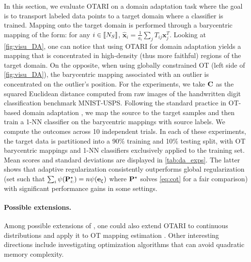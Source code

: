 In this section, we evaluate OTARI on a domain adaptation task where the goal is to transport labeled data points to a target domain where a classifier is trained. Mapping onto the target domain is performed through a barycentric mapping of the form: for any $i \in {[\![N_S]\!]}$, $\hat{\bm{x}}_i = \frac{1}{a_i} \sum_j T_{ij} \bm{x}_j^T$.
Looking at \cref{fig:visu_DA}, one can notice that using OTARI for domain adaptation yields a mapping that is concentrated in high-density (thus more faithful) regions of the target domain. On the opposite, when using globally constrained OT (left side of \cref{fig:visu_DA}), the barycentric mapping associated with an outlier is concentrated on the outlier's position. For the experiments, we take $\mathbf{C}$ as the squared Euclidean distance computed from raw images of the handwritten digit classification benchmark MNIST-USPS. 
Following the standard practice in OT-based domain adaptation \citep{flamary2016optimal}, we map the source to the target samples and then train a 1-NN classifier on the barycentric mappings with source labels.
We compute the outcomes across 10 independent trials. In each of these experiments, the target data is partitioned into a 90\% training and 10\% testing split, with OT barycentric mappings and 1-NN classifiers exclusively applied to the training set. Mean scores and standard deviations are displayed in \cref{tab:da_exps}. The latter shows that adaptive regularization consistently outperforms global regularization (set such that $\sum_i \psi({\mathbf{P}}^\star_{i:}) = n \psi(\mathbf{e}_{\xi})$ where ${\mathbf{P}}^\star$ solves \ref{eq:cot} for a fair comparison) with significant performance gains in some settings.

\paragraph{Possible extensions.}
Among possible extensions of , one could also extend OTARI to continuous distributions and apply it to OT mapping estimation \citep{pooladian2021entropic}. Other interesting directions include
investigating optimization algorithms that can avoid quadratic memory complexity.
